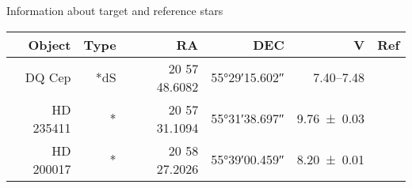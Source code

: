 
\caption{Information about target and reference stars}
\begin{tabular}{rrrrrr}
	\hline
	Object & Type &            RA &                DEC &                      V &                        Ref \\ \hline\hline
	DQ Cep &  *dS & 20 57 48.6082 & \ang{55;29;15.602} & \SIrange{7.40}{7.48}{} & \citet{1971GCVS3.C......0K} \\
	HD 235411 &    * & 20 57 31.1094 & \ang{55;31;38.697} &     \SI{9.76\pm0.03}{} &  \citet{2000AA...355L..27H} \\
	HD 200017 &    * & 20 58 27.2026 & \ang{55;39;00.459} &     \SI{8.20\pm0.01}{} &  \citet{2000AA...355L..27H} \\ \hline
\end{tabular}